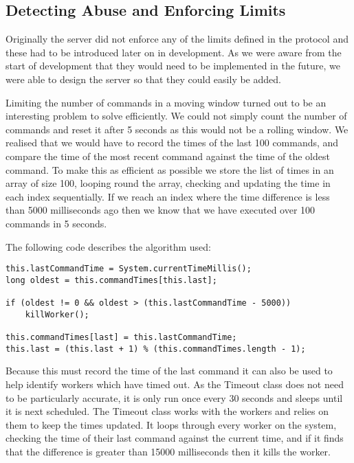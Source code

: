 \subsection{Detecting Abuse and Enforcing Limits}
Originally the server did not enforce any of the limits defined in the protocol and these had to be introduced later on in development. As we were aware from the start of development that they would need to be implemented in the future, we were able to design the server so that they could easily be added. 

Limiting the number of commands in a moving window turned out to be an interesting problem to solve efficiently. We could not simply count the number of commands and reset it after 5 seconds as this would not be a rolling window. We realised that we would have to record the times of the last 100 commands, and compare the time of the most recent command against the time of the oldest command. To make this as efficient as possible we store the list of times in an array of size 100, looping round the array, checking and updating the time in each index sequentially. If we reach an index where the time difference is less than 5000 milliseconds ago then we know that we have executed over 100 commands in 5 seconds.

The following code describes the algorithm used:

\begin{verbatim}
this.lastCommandTime = System.currentTimeMillis();
long oldest = this.commandTimes[this.last];

if (oldest != 0 && oldest > (this.lastCommandTime - 5000))
    killWorker();

this.commandTimes[last] = this.lastCommandTime;
this.last = (this.last + 1) % (this.commandTimes.length - 1);
\end{verbatim}

Because this must record the time of the last command it can also be used to help identify workers which have timed out. As the Timeout class does not need to be particularly accurate, it is only run once every 30 seconds and sleeps until it is next scheduled. The Timeout class works with the workers and relies on them to keep the times updated. It loops through every worker on the system, checking the time of their last command against the current time, and if it finds that the difference is greater than 15000 milliseconds then it kills the worker.
